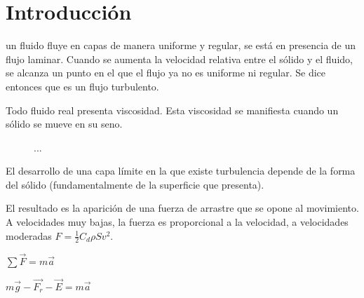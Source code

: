 \documentclass[journal]{IEEEtran}
\begin{document}
%
\IEEEpeerreviewmaketitle

\section{Introducción}

 un fluido fluye en capas de manera uniforme y regular, se está en presencia de un flujo laminar. Cuando se aumenta la velocidad relativa entre el sólido y el fluido, se alcanza un punto en el que el flujo ya no es uniforme ni regular. Se dice entonces que es un flujo turbulento.

Todo fluido real presenta viscosidad. Esta viscosidad se manifiesta cuando un sólido se mueve en su seno.

\begin{figure}[!htb]
  \centering
  \caption{...}
  \label{fig:gota}
\end{figure}

El desarrollo de una capa límite en la que existe turbulencia depende de la forma del sólido (fundamentalmente de la superficie que presenta).

El resultado es la aparición de una fuerza de arrastre que se opone al movimiento. A velocidades muy bajas, la fuerza es proporcional a la velocidad, a velocidades moderadas $F = \displaystyle\frac{1}{2} C_d \rho S v^2$.

$\sum \vec{F} = m\vec{a}$

$m\vec{g} - \vec{F_r} - \vec{E} = m\vec{a}$
\end{document}

